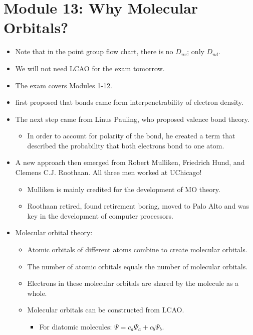 \documentclass[../notes.tex]{subfiles}
\begin{document}
\section{Module 13: Why Molecular Orbitals?}
\begin{itemize}
    \item Note that in the point group flow chart, there is no $D_{nv}$; only $D_{nd}$.
    \item We will not need LCAO for the exam tomorrow.
    \item The exam covers Modules 1-12.
    \item \textcite{bib:Lewis} first proposed that bonds came form interpenetrability of electron density.
    \item The next step came from Linus Pauling, who proposed valence bond theory.
    \begin{itemize}
        \item In order to account for polarity of the bond, he created a term that described the probability that both electrons bond to one atom.
    \end{itemize}
    \item A new approach then emerged from Robert Mulliken, Friedrich Hund, and Clemens C.J. Roothaan. All three men worked at UChicago!
    \begin{itemize}
        \item Mulliken is mainly credited for the development of MO theory.
        \item Roothaan retired, found retirement boring, moved to Palo Alto and was key in the development of computer processors.
    \end{itemize}
    \item Molecular orbital theory:
    \begin{itemize}
        \item Atomic orbitals of different atoms combine to create molecular orbitals.
        \item The number of atomic orbitals equals the number of molecular orbitals.
        \item Electrons in these molecular orbitals are shared by the molecule as a whole.
        \item Molecular orbitals can be constructed from LCAO.
        \begin{itemize}
            \item For diatomic molecules: $\Psi=c_a\Psi_a+c_b\Psi_b$.
        \end{itemize}
    \end{itemize}

\end{itemize}
\end{document}

